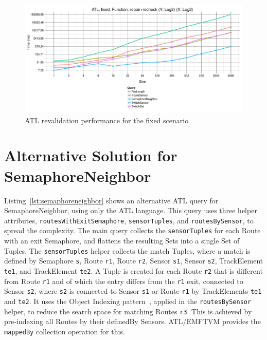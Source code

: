 \documentclass[submission,copyright,creativecommons]{eptcs}
\begin{document}
\begin{figure}[ht]
\centerline{
\includegraphics[width=15cm]{figures/fixed-ATL-GroupBy-Query-time-revalidation}}
\caption{ATL revalidation performance for the fixed scenario}
\label{fig:atl-recheck-performance}
\end{figure}


\appendix

\section{Alternative Solution for SemaphoreNeighbor}
\label{appendix:a}

Listing~\ref{lst:semaphoreneighbor} shows an alternative ATL query for SemaphoreNeighbor, using only the ATL language. This query uses three helper attributes, \texttt{routesWithExitSemaphore}, \texttt{sensorTuples}, and \texttt{routesBySensor}, to spread the complexity. The main query collects the \texttt{sensorTuples} for each Route with an exit Semaphore, and flattens the resulting Sets into a single Set of Tuples. The \texttt{sensorTuples} helper collects the match Tuples, where a match is defined by Semaphore \texttt{s}, Route \texttt{r1}, Route \texttt{r2}, Sensor \texttt{s1}, Sensor \texttt{s2}, TrackElement \texttt{te1}, and TrackElement \texttt{te2}. A Tuple is created for each Route \texttt{r2} that is different from Route \texttt{r1} and of which the entry differs from the \texttt{r1} exit, connected to Sensor \texttt{s2}, where \texttt{s2} is connected to Sensor \texttt{s1} or Route \texttt{r1} by TrackElements \texttt{te1} and \texttt{te2}. It uses the Object Indexing pattern~\cite{conf/icsea/Lano2011}, applied in the \texttt{routesBySensor} helper, to reduce the search space for matching Routes \texttt{r3}. This is achieved by pre-indexing all Routes by their definedBy Sensors. ATL/EMFTVM provides the \texttt{mappedBy} collection operation for this.
\end{document}
